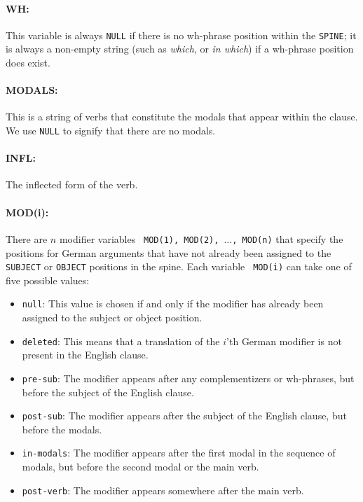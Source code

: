 \documentclass[11pt]{report}
\theoremstyle{plain}
\begin{document}
{\paragraph{WH:} This variable is always {\tt NULL} if there is no
wh-phrase position within the {\tt SPINE}; it is always a
non-empty string (such as {\em which}, or {\em in which}) if a
wh-phrase position does exist.

\paragraph{MODALS:} This is a string of verbs that constitute the
modals that appear within the clause. We use {\tt NULL} to signify
that there are no modals.

\paragraph{INFL:} The inflected form of the verb.

\paragraph{MOD(i):} There are $n$ modifier variables {\tt
  MOD(1), MOD(2), $\ldots$, MOD(n)} that specify the positions for
German arguments that have not already been assigned to the {\tt
SUBJECT} or {\tt OBJECT} positions in the spine. Each variable {\tt
MOD(i)} can take one of five possible values:

\begin{itemize}
\item {\tt null}: This value is chosen if and only if the modifier has
  already been assigned to the subject or object position.
\item {\tt deleted}: This means that a translation of the $i$'th
  German modifier is not present in the English clause.
\item {\tt pre-sub}: The modifier appears after any complementizers or
  wh-phrases, but before the subject of the English clause.
\item {\tt post-sub}: The modifier appears after the subject of the
  English clause, but before the modals.
\item {\tt in-modals}: The modifier appears after the first modal in
  the sequence of modals, but before the second modal or the main
  verb. 
\item {\tt post-verb}: The modifier appears somewhere after the main
  verb. 
\end{itemize}


}
\end{document}
